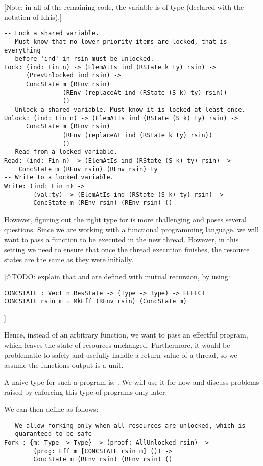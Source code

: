 [Note: in all of the remaining code, the variable  is of type
 (declared with the  notation of Idris).]

\begin{verbatim}
-- Lock a shared variable.
-- Must know that no lower priority items are locked, that is everything
-- before 'ind' in rsin must be unlocked.
Lock: (ind: Fin n) -> (ElemAtIs ind (RState k ty) rsin) ->
      (PrevUnlocked ind rsin) ->
      ConcState m (REnv rsin)
                (REnv (replaceAt ind (RState (S k) ty) rsin))
                ()
-- Unlock a shared variable. Must know it is locked at least once.
Unlock: (ind: Fin n) -> (ElemAtIs ind (RState (S k) ty) rsin) ->
      ConcState m (REnv rsin)
                (REnv (replaceAt ind (RState k ty) rsin))
                ()
-- Read from a locked variable.
Read: (ind: Fin n) -> (ElemAtIs ind (RState (S k) ty) rsin) ->
    ConcState m (REnv rsin) (REnv rsin) ty
-- Write to a locked variable.
Write: (ind: Fin n) ->
        (val:ty) -> (ElemAtIs ind (RState (S k) ty) rsin) ->
        ConcState m (REnv rsin) (REnv rsin) ()
\end{verbatim}

However, figuring out the right type for  is more challenging and
poses several questions. Since we are working with a functional programming
language, we will want to pass a function to be executed in the new thread.
However, in this setting we need to ensure that once the thread execution
finishes, the resource states are the same as they were initially.

[@TODO: explain that  and  are defined with
mutual recursion, by using:
\begin{verbatim}
CONCSTATE : Vect n ResState -> (Type -> Type) -> EFFECT
CONCSTATE rsin m = MkEff (REnv rsin) (ConcState m)
\end{verbatim}
]

Hence, instead of an arbitrary function, we want to pass an effectful program,
which leaves the state of resources unchanged. Furthermore, it would be
problematic to safely and usefully handle a return value of a thread, so we
assume the functions output is a unit.

A naive type for such a program is: . We will
use it for now and discuss problems raised by enforcing this type of programs
only later.

We can then define  as follows:
\begin{verbatim}
-- We allow forking only when all resources are unlocked, which is
-- guaranteed to be safe
Fork : {m: Type -> Type} -> (proof: AllUnlocked rsin) ->
        (prog: Eff m [CONCSTATE rsin m] ()) ->
        ConcState m (REnv rsin) (REnv rsin) ()
\end{verbatim}

